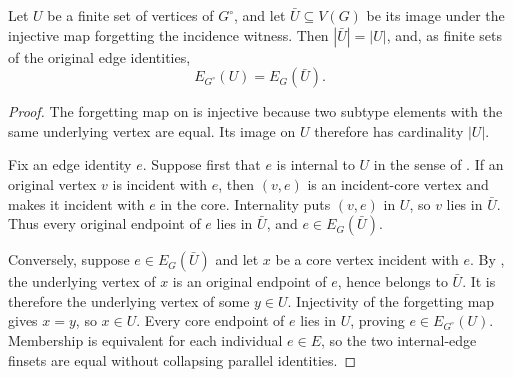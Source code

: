 \begin{lemma}
Let $U$ be a finite set of vertices of $G^{\circ}$, and let
$\bar U\subseteq V(G)$ be its image under the injective map forgetting the
incidence witness.  Then $|\bar U|=|U|$, and, as finite sets of the original
edge identities,
\[
 E_{G^{\circ}}(U)=E_G(\bar U).
\]
\end{lemma}
\begin{proof}
The forgetting map on  is injective because two
subtype elements with the same underlying vertex are equal.  Its image on
$U$ therefore has cardinality $|U|$.

Fix an edge identity $e$.  Suppose first that $e$ is internal to $U$ in the
sense of .  If an original vertex $v$ is incident
with $e$, then $(v,e)$ is an incident-core vertex and
 makes it incident with $e$ in the core.
Internality puts $(v,e)$ in $U$, so $v$ lies in $\bar U$.  Thus every
original endpoint of $e$ lies in $\bar U$, and $e\in E_G(\bar U)$.

Conversely, suppose $e\in E_G(\bar U)$ and let $x$ be a core vertex
incident with $e$.  By , the underlying
vertex of $x$ is an original endpoint of $e$, hence belongs to $\bar U$.
It is therefore the underlying vertex of some $y\in U$.  Injectivity of the
forgetting map gives $x=y$, so $x\in U$.  Every core endpoint of $e$ lies in
$U$, proving $e\in E_{G^{\circ}}(U)$.  Membership is equivalent for each
individual $e\in E$, so the two internal-edge finsets are equal without
collapsing parallel identities.
\end{proof}
